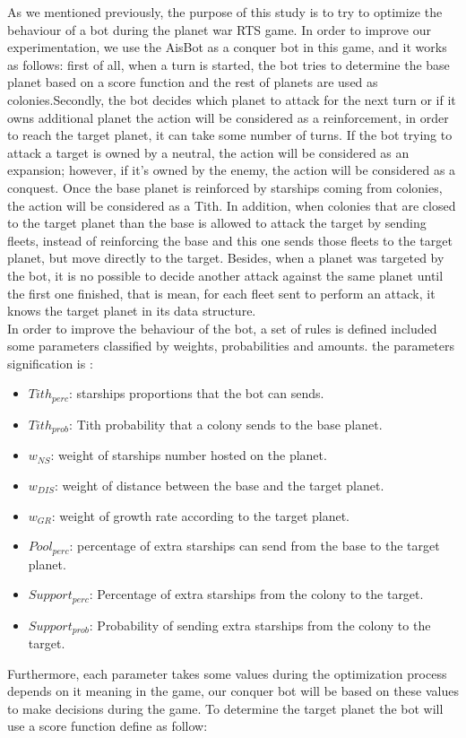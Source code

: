 \documentclass[conference]{IEEEtran}
\begin{document}
As we mentioned previously, the purpose of this study is to try to optimize the behaviour of a bot during the planet war RTS game. In order to improve our experimentation, we use the AisBot as a conquer bot in this game, and it works as follows: first of all, when a turn is started, the bot tries to determine the base planet based on a score function and the rest of planets are used as colonies.Secondly, the bot decides which planet to attack for the next turn or if it owns additional planet the action will be considered as a reinforcement, in order to reach the target planet, it can take some number of turns. If the bot trying to attack a target is owned by a neutral, the action will be considered as an expansion; however, if it's owned by the enemy, the action will be considered as a conquest. Once the base planet is reinforced by starships coming from colonies, the action will be considered as a Tith. In addition, when colonies that are closed to the target planet than the base is allowed to attack the target by sending fleets, instead of reinforcing the base and this one sends those fleets to the target planet, but move directly to the target. Besides, when a planet was targeted by the bot, it is no possible to decide another attack against the same planet until the first one finished, that is mean, for each fleet sent to perform an attack, it knows the target planet in its data structure. \\





In order to improve the behaviour of the bot,  a set of rules is defined included some parameters classified by weights, probabilities and amounts. the parameters signification is : 
\begin{itemize}
\item \textit{$Tith_{perc}$}: starships proportions that the bot can sends.
\item \textit{$Tith_{prob}$}: Tith probability that a colony sends to the base planet.
\item \textit{$w_{NS}$}: weight of starships number hosted on the planet.
\item \textit{$w_{DIS}$}: weight of distance between the base and the target planet.
\item \textit{$w_{GR}$}: weight of growth rate according to the target planet.
\item \textit{$Pool_{perc}$}: percentage of extra starships can send from the base to the target planet.
\item \textit{$Support_{perc}$}: Percentage of extra starships from the colony to the target.
\item \textit{$Support_{prob}$}: Probability of sending extra starships from the colony to the target.
\end{itemize}
Furthermore, each parameter takes some values during the optimization process depends on it meaning in the game, our conquer bot will be based on these values to make decisions during the game. To determine the target planet the bot will use a score function define as follow:
\end{document}
